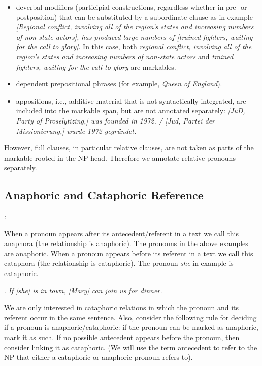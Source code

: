 \documentclass[a4paper]{article}
\begin{document}
{{\begin{itemize}
\item deverbal modifiers (participial constructions, regardless whether in pre- or postposition) that
can be substituted by a subordinate clause as in example  {\sl [Regional conflict, involving all of the region's states and increasing numbers of non-state actors], has produced large numbers of [trained fighters, waiting for the call to glory]}. 
In this case, both {\sl regional conflict, involving all of the region’s states and increasing numbers of non-state actors} and {\sl trained fighters, waiting for the call to glory} are markables.
\item dependent prepositional phrases (for example, {\sl Queen of England}).
\item  appositions, i.e., additive material that is not syntactically integrated, are included into the markable span, but are not annotated separately: {\sl [JuD, Party of Proselytizing,] was founded in 1972. / [Jud, Partei der Missionierung,] wurde 1972 gegründet.}
\end{itemize}

However, full clauses, in particular relative clauses, are not taken as parts of the markable rooted in the NP head. Therefore we annotate relative pronouns separately.

\subsection{Anaphoric and Cataphoric Reference}

\cite[p. 4]{GuillouEtAlGuide}:

When a pronoun appears after its antecedent/referent in a text we call this anaphora (the relationship is anaphoric). The pronouns in the above examples are anaphoric. When a pronoun appears before its referent in a text we call this
cataphora (the relationship is cataphoric). The pronoun {\sl she} in example \Next is cataphoric.

\ex.
{\sl If [she] is in town, [Mary] can join us for dinner.}

We are only interested in cataphoric relations in which the pronoun and its referent occur in the same sentence. Also, consider the following rule for deciding if a pronoun is anaphoric/cataphoric: if the pronoun can be marked as anaphoric, mark it as such. If no possible antecedent appears before the pronoun, then consider linking it as cataphoric. (We will use the term antecedent to refer to
the NP that either a cataphoric or anaphoric pronoun refers to).

}}
\end{document}
